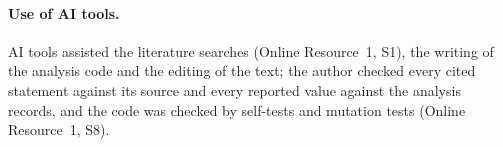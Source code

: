 \documentclass[pdflatex,sn-basic]{sn-jnl}
\newcommand{\Sref}[1]{Online Resource~1, S#1}
\begin{document}
\paragraph{Use of AI tools.} AI tools assisted the literature searches (\Sref{1}), the writing of the analysis code and the editing of the text; the author checked every cited statement against its source and every reported value against the analysis records, and the code was checked by self-tests and mutation tests (\Sref{8}).


\end{document}
